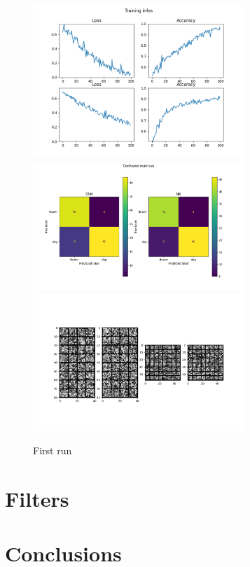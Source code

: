 \documentclass{report}
\begin{document}
\begin{figure}
    \centering
    \includegraphics[width=8cm]{images/0.82/training_infos.png}\hfill
    \includegraphics[width=8cm]{images/0.82/conf_mat.png}\hfill
    \includegraphics[width=8cm]{images/0.82/cnn_filters.png}
    \caption{First run}
    \label{fig:my_label}
\end{figure}

\chapter{Filters}
\chapter{Conclusions}
\end{document}

